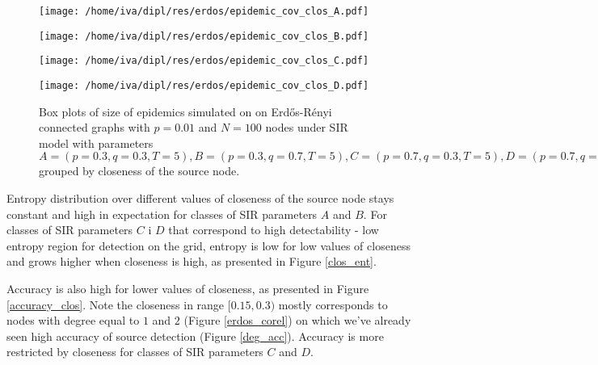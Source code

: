\documentclass[times, utf8, diplomski]{fer}
\begin{document}
\begin{figure}[H]
\begin{minipage}{\textwidth}
\begin{minipage}{0.50\textwidth}
\texttt{[image: /home/iva/dipl/res/erdos/epidemic\_cov\_clos\_A.pdf]}
\end{minipage}
\begin{minipage}{0.50\textwidth}
\texttt{[image: /home/iva/dipl/res/erdos/epidemic\_cov\_clos\_B.pdf]}
\end{minipage}

\begin{minipage}{0.50\textwidth}
\texttt{[image: /home/iva/dipl/res/erdos/epidemic\_cov\_clos\_C.pdf]}
\end{minipage}
\begin{minipage}{0.50\textwidth}
\texttt{[image: /home/iva/dipl/res/erdos/epidemic\_cov\_clos\_D.pdf]}
\end{minipage}
\caption{Box plots of size of epidemics simulated on on  Erd{\H{o}}s-R{\'{e}}nyi connected graphs with $p=0.01$ and $N=100$ nodes under SIR model with parameters $A = (p=0.3, q=0.3, T=5), B = (p=0.3, q=0.7, T=5), C = (p=0.7, q=0.3, T=5), D = (p=0.7, q=0.7, T=5)$ grouped by closeness of the source node.}
\label{cov_clos}
\end{minipage}
\end{figure}

Entropy distribution over different values of closeness of the source node stays constant and high in expectation for classes of SIR parameters $A$ and $B$. For classes of SIR parameters $C$ i $D$ that correspond to high detectability - low entropy region for detection on the grid, entropy is low for  low values of closeness and grows higher when closeness is high, as presented in Figure \ref{clos_ent}. 

Accuracy is also high for lower values of closeness, as presented in Figure \ref{accuracy_clos}. Note the closeness in range $[0.15, 0.3)$ mostly corresponds to nodes with degree  equal to $1$ and $2$ (Figure \ref{erdos_corel}) on which we've already seen high accuracy of source detection (Figure \ref{deg_acc}).  Accuracy is more restricted by closeness for classes of SIR parameters $C$ and $D$. 
\end{document}
